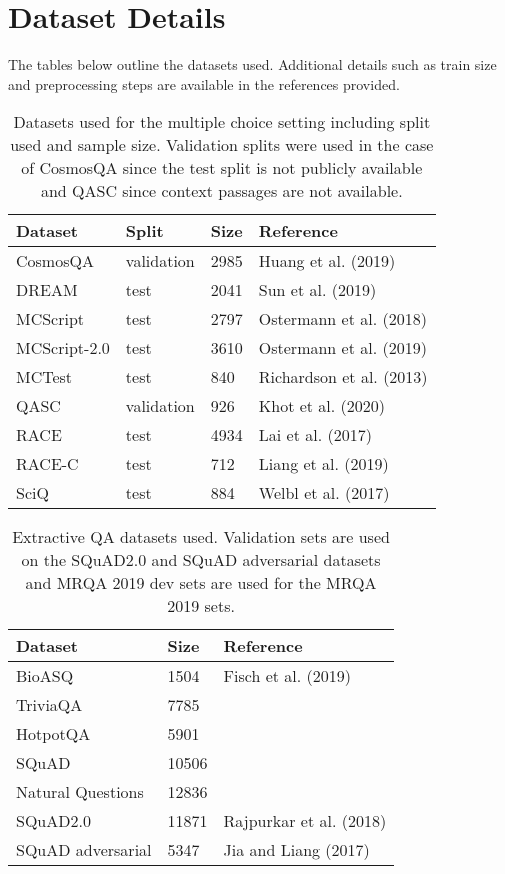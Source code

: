 \documentclass[11pt]{article}
\begin{document}
\section{Dataset Details}
\label{sec:appendix}

The tables below outline the datasets used. Additional details such as train size and preprocessing steps are available in the references provided.

\begin{table*}[]
\centering
\begin{tabular}{llll}
\hline
Dataset & Split & Size & Reference \\ \hline
CosmosQA & validation & 2985 & Huang et al. (2019) \\
DREAM & test & 2041 & Sun et al. (2019) \\
MCScript & test & 2797 & Ostermann et al. (2018) \\
MCScript-2.0 & test & 3610 & Ostermann et al. (2019) \\
MCTest & test & 840 & Richardson et al. (2013) \\
QASC & validation & 926 & Khot et al. (2020) \\
RACE & test & 4934 & Lai et al. (2017) \\
RACE-C & test & 712 & Liang et al. (2019) \\
SciQ & test & 884 & Welbl et al. (2017) \\ \hline
\end{tabular}
\caption{Datasets used for the multiple choice setting including split used and sample size. Validation splits were used in the case of CosmosQA since the test split is not publicly available and QASC since context passages are not available.}
\label{tab:mc_qa_datasets}
\end{table*}

\begin{table*}[]
\centering
\begin{tabular}{lll}
\hline
Dataset & Size & Reference \\ \hline
BioASQ & 1504 & Fisch et al. (2019) \\
TriviaQA & 7785 &  \\
HotpotQA & 5901 &  \\
SQuAD & 10506 &  \\
Natural Questions & 12836 &  \\
SQuAD2.0 & 11871 & Rajpurkar et al. (2018) \\
SQuAD adversarial & 5347 & Jia and Liang (2017) \\ \hline
\end{tabular}
\caption{Extractive QA datasets used. Validation sets are used on the SQuAD2.0 and SQuAD adversarial datasets and MRQA 2019 dev sets are used for the MRQA 2019 sets.}
\label{tab:extractive_qa_datasets}
\end{table*}
\end{document}
